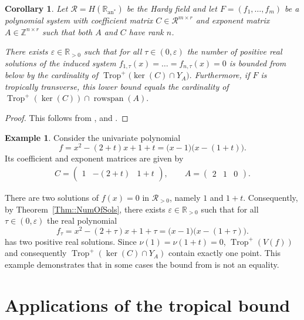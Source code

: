 \documentclass{article}
\newtheorem{corollary}[theorem]{Corollary}
\theoremstyle{definition}
\newtheorem{example}[theorem]{Example}
\DeclareMathOperator{\Trop}{Trop}
\newcommand{\R}{\mathbb{R}}
\newcommand{\RR}{\mathcal{R}}
\begin{document}
\begin{corollary}
\label{cor: generalized Viro patchworking}
     Let $\RR = H(\R_{\text{an}^*})$ be the Hardy field and let $F = (f_1, \dots, f_m)$ be a polynomial system with coefficient matrix $C \in \mathcal{R}^{m\times r}$ and exponent matrix $A \in \mathbb{Z}^{n\times r}$ such that both $A$ and $C$ have rank $n$.

    There exists $\varepsilon \in \mathbb{R}_{>0}$ such that for all $\tau \in (0,\varepsilon)$ the number of positive real solutions of the induced system
    $f_{1,\tau}(x) = \dots = f_{n,\tau}(x) = 0$ is bounded from below by the cardinality of $\Trop^+\big( \ker(C)  \cap Y_A\big).$
    Furthermore, if $F$ is tropically transverse, this lower bound equals the cardinality of
    $\Trop^+(\ker(C))  \cap \operatorname{rowspan}(A).$
\end{corollary}
 \begin{proof}
     This follows from ,  and .
 \end{proof}


\begin{example}
    Consider the univariate polynomial  
    \[  f=  x^2 -(2+t)x+1+t = \big(x-1\big)\big(x-(1+t)\big). \]
    Its coefficient and exponent matrices are given by
      \begin{align*}
          C = \begin{pmatrix}
        1 & -(2+t) & 1+t
    \end{pmatrix}, \qquad  A = \begin{pmatrix}
        2 & 1 & 0
    \end{pmatrix}.
      \end{align*}
   
      There are two solutions of $f(x) = 0$ in $\mathcal{R}_{>0}$, namely $1$ and $1+t$. Consequently, by Theorem~\ref{Thm::NumOfSols}, there exists $\varepsilon \in \mathbb{R}_{>0}$ such that for all $\tau \in (0,\varepsilon)$ the real polynomial
          \[  f_\tau=  x^2 -(2+\tau)x+1+\tau = \big(x-1\big)\big(x-(1+\tau)\big). \]
      has two positive real solutions. Since $\nu(1) = \nu(1+t) = 0$, $\Trop^+(V(f))$ and consequently  $\Trop^+(\ker(C) \cap Y_A)$ contain exactly one point. This example demonstrates that in some cases the bound from  is not an equality.
\end{example}

\section{Applications of the tropical bound}
\label{Section::SparsePolys}
\end{document}
